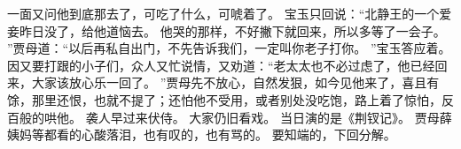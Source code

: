 一面又问他到底那去了，可吃了什么，可唬着了。
宝玉只回说：“北静王的一个爱妾昨日没了，给他道恼去。
他哭的那样，不好撇下就回来，所以多等了一会子。
”贾母道：“以后再私自出门，不先告诉我们，一定叫你老子打你。
”宝玉答应着。
因又要打跟的小子们，众人又忙说情，又劝道：“老太太也不必过虑了，他已经回来，大家该放心乐一回了。
”贾母先不放心，自然发狠，如今见他来了，喜且有馀，那里还恨，也就不提了；还怕他不受用，或者别处没吃饱，路上着了惊怕，反百般的哄他。
袭人早过来伏侍。
大家仍旧看戏。
当日演的是《荆钗记》。
贾母薛姨妈等都看的心酸落泪，也有叹的，也有骂的。
要知端的，下回分解。
\par
{}
